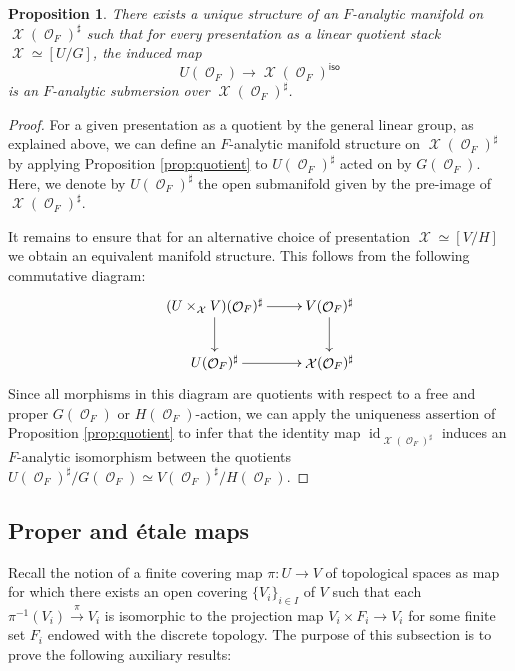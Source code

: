 \documentclass{article}
\DeclareMathOperator{\iso}{\mathsf{iso}}
\DeclareMathOperator{\Xc}{\mathcal{X}}
\DeclareMathOperator{\Oc}{\mathcal{O}}
\DeclareMathOperator{\id}{id}
\theoremstyle{definition}
\theoremstyle{plain}
\newtheorem{proposition}[definition]{Proposition}
\begin{document}
\begin{proposition}\label{presin}
There exists a unique structure of an $F$-analytic manifold on $\Xc(\Oc_F)^{\sharp}$ such that for every presentation as a linear quotient stack $\Xc\simeq [U/G]$, the induced map 
$$U(\Oc_F) \to \Xc(\Oc_F)^{\iso}$$ 
is an $F$-analytic submersion over $\Xc(\Oc_F)^{\sharp}$.
\end{proposition}
\begin{proof}
For a given presentation as a quotient by the general linear group, as explained above, we can define an $F$-analytic manifold structure on $\Xc(\Oc_F)^{\sharp}$ by applying Proposition \ref{prop:quotient} to $U(\Oc_F)^{\sharp}$ acted on by $G(\Oc_F)$. Here, we denote by $U(\Oc_F)^{\sharp}$ the open submanifold given by the pre-image of $\Xc(\Oc_F)^{\sharp}$.

It remains to ensure that for an alternative choice of presentation $\Xc \simeq [V/H]$ we obtain an equivalent manifold structure. This follows from the following commutative diagram:
\[
\xymatrix{
(U \times_{\Xc} V)(\Oc_F)^{\sharp} \ar[r] \ar[d] & V(\Oc_F)^{\sharp} \ar[d] \\
U(\Oc_F)^{\sharp} \ar[r] & \Xc(\Oc_F)^{\sharp} 
}
\]
Since all morphisms in this diagram are quotients with respect to a free and proper $G(\Oc_F)$ or $H(\Oc_F)$-action, we can apply the uniqueness assertion of Proposition \ref{prop:quotient} to infer that the identity map $\id_{\Xc(\Oc_F)^{\sharp}}$ induces an $F$-analytic isomorphism between the quotients $U(\Oc_F)^{\sharp}/G(\Oc_F) \simeq V(\Oc_F)^{\sharp}/H(\Oc_F)$.
\end{proof}

\subsection{Proper and \'etale maps}

Recall the notion of a finite covering map $\pi\colon U \to V$ of topological spaces as map for which there exists an open covering $\{V_i\}_{i \in I}$ of $V$ such that each $\pi^{-1}(V_i) \xrightarrow{\pi} V_i$ is isomorphic to the projection map $V_i \times F_i \to V_i$ for some finite set $F_i$ endowed with the discrete topology. The purpose of this subsection is to prove the following auxiliary results:
\end{document}
